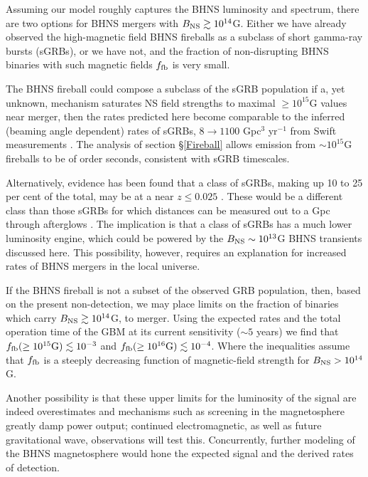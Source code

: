 Assuming our model roughly captures the BHNS luminosity and spectrum, there are two options for BHNS mergers with $B_{\rm{NS}} \gtrsim 10^{14}$G. Either we have already observed the high-magnetic field BHNS fireballs as a subclass of short gamma-ray bursts (sGRBs), or we have not, and the fraction of non-disrupting BHNS binaries with such magnetic fields $f_{\rm{fb}}$ is very small.

The BHNS fireball could compose a subclass of the sGRB population if
a, yet unknown, mechanism saturates NS field strengths to maximal
$\geq 10^{15}$G values near merger, then the rates predicted here
become comparable to the inferred (beaming angle dependent) rates of
sGRBs, $8\rightarrow 1100$ Gpc$^{3}$ yr$^{-1}$ from Swift measurements
\citep{SWIFTsGRBrates:2012}. The analysis of section \S \ref{Fireball}
allows emission from $\sim10^{15}$G fireballs to be of order seconds,
consistent with sGRB timescales.



Alternatively, evidence has been found that a class of sGRBs, making
up 10 to 25 per cent of the total, may be at a near $z \leq 0.025$
\cite{Tanvir:2005}. These would be a different class than those sGRBs
for which distances can be measured out to a Gpc through afterglows
\citep[{\em e.g.},][]{Berger:2005}. The implication is that a class of
sGRBs has a much lower luminosity engine, which could be powered by
the $B_{\rm{NS}} \sim 10^{13}$G BHNS transients discussed
here. This possibility, however, requires an
explanation for increased rates of BHNS mergers in the local universe.


If the BHNS fireball is not a subset of the observed GRB population,
then, based on the present non-detection, we may place limits on the
fraction of binaries which carry $B_{\rm{NS}} \gtrsim 10^{14}$G, to
merger. Using the expected rates and the total operation time of the
GBM at its current sensitivity ($\sim5$ years) we find that
$f_{\rm{fb}}(\geq 10^{15} \rm{G}) \lesssim 10^{-3}$ and
$f_{\rm{fb}}(\geq 10^{16} \rm{G}) \lesssim 10^{-4}$. Where the
inequalities assume that $f_{\rm{fb}}$ is a steeply decreasing
function of magnetic-field strength for $B_{\rm{NS}} > 10^{14}$G.


Another possibility is that these upper limits for the luminosity of
the signal are indeed overestimates and mechanisms such as screening
in the magnetosphere greatly damp power output; continued electromagnetic, as well as future gravitational wave, observations
will test this. Concurrently, further modeling of the BHNS
magnetosphere would hone the expected signal and the derived rates of
detection.


